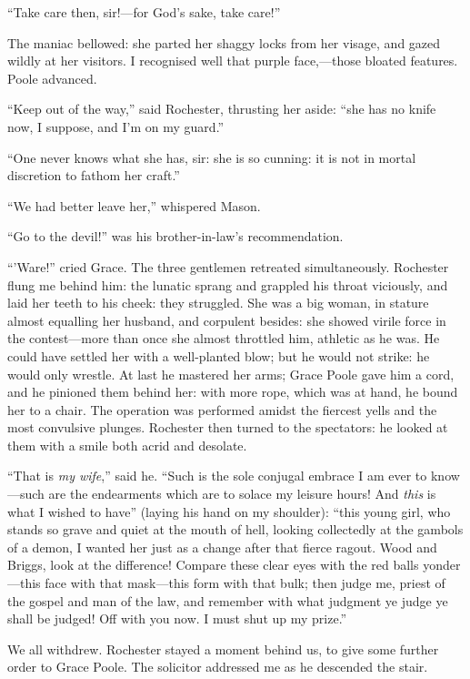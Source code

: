 \enquote{Take care then, sir!---for God's sake, take care!}

The maniac bellowed: she parted her shaggy locks from her visage, and
gazed wildly at her visitors. I recognised well that purple
face,---those bloated features. \Mrs{} Poole advanced.

\enquote{Keep out of the way,} said \Mr{} Rochester, thrusting her aside:
\enquote{she has no knife now, I suppose, and I'm on my guard.}

\enquote{One never knows what she has, sir: she is so cunning: it is not
	in mortal discretion to fathom her craft.}

\enquote{We had better leave her,} whispered Mason.

\enquote{Go to the devil!} was his brother-in-law's recommendation.

\enquote{'Ware!} cried Grace. The three gentlemen retreated
simultaneously. \Mr{} Rochester flung me behind him: the lunatic sprang
and grappled his throat viciously, and laid her teeth to his cheek: they
struggled. She was a big woman, in stature almost equalling her
husband, and corpulent besides: she showed virile force in the
contest---more than once she almost throttled him, athletic as he was.
He could have settled her with a well-planted blow; but he would not
strike: he would only wrestle. At last he mastered her arms; Grace
Poole gave him a cord, and he pinioned them behind her: with more rope,
which was at hand, he bound her to a chair. The operation was performed
amidst the fiercest yells and the most convulsive plunges. \Mr{}
Rochester then turned to the spectators: he looked at them with a smile
both acrid and desolate.

\enquote{That is \emph{my wife},} said he. \enquote{Such is the sole conjugal
	embrace I am ever to know---such are the endearments which are to solace
	my leisure hours! And \emph{this} is what I wished to have} (laying
his hand on my shoulder): \enquote{this young girl, who stands so grave
	and quiet at the mouth of hell, looking collectedly at the gambols of a
	demon, I wanted her just as a change after that fierce ragout. Wood and
	Briggs, look at the difference! Compare these clear eyes with the red
	balls yonder---this face with that mask---this form with that bulk; then
	judge me, priest of the gospel and man of the law, and remember with
	what judgment ye judge ye shall be judged! Off with you now. I must
	shut up my prize.}

We all withdrew. \Mr{} Rochester stayed a moment behind us, to give some
further order to Grace Poole. The solicitor addressed me as he
descended the stair.

